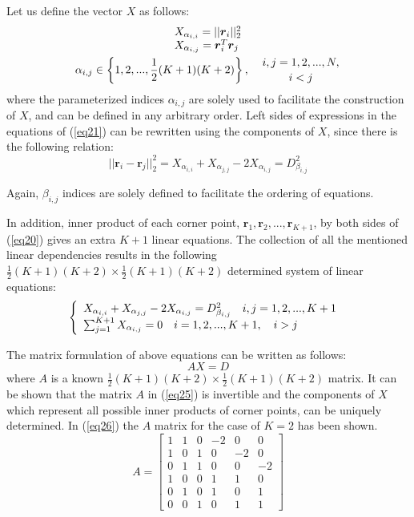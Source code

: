 \documentclass[10pt,journal,cspaper,compsoc]{IEEEtran}
\begin{document}
Let us define the vector $X$ as follows:
\begin{gather}
\label{eq22}
\begin{array}{l l}
X_{\alpha_{i,i}}=||\boldsymbol{r}_i||_2^2 \\
X_{\alpha_{i,j}}=\boldsymbol{r}_i^{T}\boldsymbol{r}_j
\end{array}
\\
\alpha_{i,j}\in\left\{1,2,...,\frac{1}{2}(K+1)(K+2)\right\}, \quad {i,j=1,2,...,N, \atop i<j}
\end{gather}
where the parameterized indices $\alpha_{i,j}$ are solely used to facilitate the construction of $X$, and can be defined in any arbitrary order. Left sides of expressions in the equations of (\ref{eq21}) can be rewritten using the components of $X$, since there is the following relation:
\begin{equation}
\label{eq23}
||\boldsymbol{r}_i-\boldsymbol{r}_j||_2^2=X_{\alpha_{i,i}}+X_{\alpha_{j,j}}-2X_{\alpha_{i,j}}=D^2_{\beta_{i,j}}
\end{equation}

Again, $\beta_{i,j}$ indices are solely defined to facilitate the ordering of equations.

In addition, inner product of each corner point, $\boldsymbol{r}_1,\boldsymbol{r}_2,...,\boldsymbol{r}_{K+1}$, by both sides of (\ref{eq20}) gives an extra $K+1$ linear equations. The collection of all the mentioned linear dependencies results in the following $\frac{1}{2}(K+1)(K+2)\times \frac{1}{2}(K+1)(K+2)$ determined system of linear equations:
\begin{equation}
\label{eq24}
\left\{
  \begin{array}{l l}
    X_{\alpha_{i,i}}+X_{\alpha_{j,j}}-2X_{\alpha_{i,j}}=D^2_{\beta_{i,j}} \quad i,j=1,2,...,K+1\\           
    \sum_{j=1}^{K+1}X_{\alpha_{i,j}}=0 \quad i=1,2,...,K+1,\quad i>j
  \end{array} \right.\    
\end{equation}

The matrix formulation of above equations can be written as follows:
\begin{equation}
\label{eq25}
AX=D
\end{equation}
where $A$ is a known $\frac{1}{2}(K+1)(K+2)\times \frac{1}{2}(K+1)(K+2)$ matrix. It can be shown that the matrix $A$ in (\ref{eq25}) is invertible and the components of $X$ which represent all possible inner products of corner points, can be uniquely determined. In (\ref{eq26}) the $A$ matrix for the case of $K=2$ has been shown.
\begin{equation}
\label{eq26}
A=\left[
\begin{array}{cccccc}
1&1&0&-2&0&0\\
1&0&1&0&-2&0\\
0&1&1&0&0&-2\\
1&0&0&1&1&0\\
0&1&0&1&0&1\\
0&0&1&0&1&1
\end{array}
\right]
\end{equation}
\end{document}
